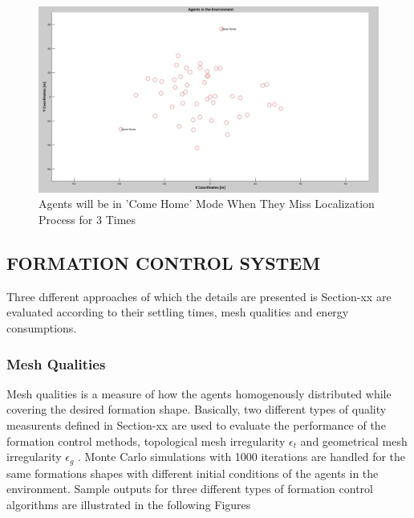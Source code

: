 			\begin{figure}[H]
				\caption{Agents will be in 'Come Home' Mode When They Miss Localization Process for 3 Times}
				\centerline{\includegraphics[scale = 0.30]{Lost-2-3}}
			\end{figure} 		
		
		
		
		\subsection{FORMATION CONTROL SYSTEM}
  Three dıfferent approaches of which the details are presented is Section-xx are evaluated according to their settling times, mesh qualities and energy consumptions. 
  \subsubsection{Mesh Qualities} 
  Mesh qualities is a measure of how the agents homogenously distributed while covering the desired formation shape. Basically, two different types of quality measurents defined in Section-xx are used to evaluate the performance of the formation control methods, topological mesh irregularity $\epsilon_t$ and geometrical mesh irregularity $\epsilon_g$ . Monte Carlo simulations with 1000 iterations are handled for the same formations shapes with different initial conditions of the agents in the environment. Sample outputs for three different types of formation control algorithms are illustrated in the following Figures
  
		
		
